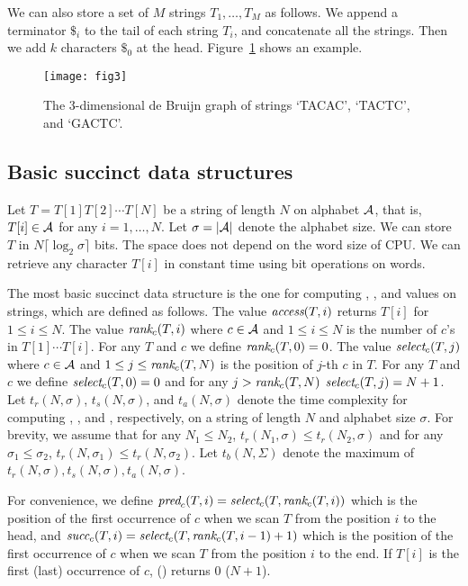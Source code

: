 We can also store a set of $M$ strings $T_1,\ldots,T_M$ as follows.
We append a terminator $\$_i$ to the tail of each string $T_i$,
and concatenate all the strings.  Then we add $k$ characters $\$_0$ at the head.
Figure~\ref{p1-fig:debruijn} shows an example.




\begin{figure}[bt]
\begin{center}
  \texttt{[image: fig3]}
\caption{The $3$-dimensional de Bruijn graph of strings `TACAC', `TACTC', and
`GACTC'.}
\label{p1-fig:debruijn}
\end{center}
\end{figure}

\subsection{Basic succinct data structures}\label{p1-sec:rank}

Let $T = T[1] T[2] \cdots T[N]$ be a string of length $N$ on alphabet ${\cal A}$,
that is, $T[i] \in {\cal A}$ for any $i=1,\ldots,N$.
Let $\sigma = |{\cal A}|$ denote the alphabet size.
We can store $T$ in $N \lceil \log_2 \sigma \rceil$ bits.  The space does not
depend on the word size of CPU.  We can retrieve any character $T[i]$ in constant
time using bit operations on words.

The most basic succinct data structure is the one for computing {\rank}, {\select}, and {\access}
values on strings, which are defined as follows.
The value ${\textit{access}}(T,i)$ returns $T[i]$ for $1 \le i \le N$.
The value ${\textit{rank}}_c(T,i)$ where $c \in {\cal A}$ and $1 \le i \le N$
is the number of $c$'s in $T[1] \cdots T[i]$.  For any $T$ and $c$ we define
${\textit{rank}}_c(T,0) = 0$.
The value ${\textit{select}}_c(T,j)$ where $c \in {\cal A}$ and $1 \le j \le {\textit{rank}}_c(T,N)$
is the position of $j$-th $c$ in $T$.
For any $T$ and $c$ we define ${\textit{select}}_c(T,0) = 0$ and for any $j > {\textit{rank}}_c(T,N)$
${\textit{select}}_c(T,j) = N+1$.
Let $t_r(N,\sigma)$, $t_s(N,\sigma)$, and $t_a(N,\sigma)$ denote the time complexity for computing
{\rank}, {\select}, and {\access}, respectively, on a string of length $N$ and alphabet size $\sigma$.
For brevity, we assume that 
for any $N_1 \le N_2$, $t_r(N_1,\sigma) \le t_r(N_2,\sigma)$ and
for any $\sigma_1 \le \sigma_2$, $t_r(N,\sigma_1) \le t_r(N,\sigma_2)$.
Let $t_b(N,\Sigma)$ denote the maximum of 
$t_r(N,\sigma),t_s(N,\sigma),t_a(N,\sigma)$.

For convenience, we define ${\textit{pred}}_c(T,i) = {\textit{select}}_c(T, {\textit{rank}}_c(T, i))$
which is the position of the first occurrence of $c$ when we scan $T$ from the position $i$ to the head,
and ${\textit{succ}}_c(T,i) = {\textit{select}}_c(T, {\textit{rank}}_c(T, i-1)+1)$
which is the position of the first occurrence of $c$ when we scan $T$ from the position $i$ to the end.
If $T[i]$ is the first (last) occurrence of $c$, {\pred} (\succ) returns $0$ ($N+1$).

